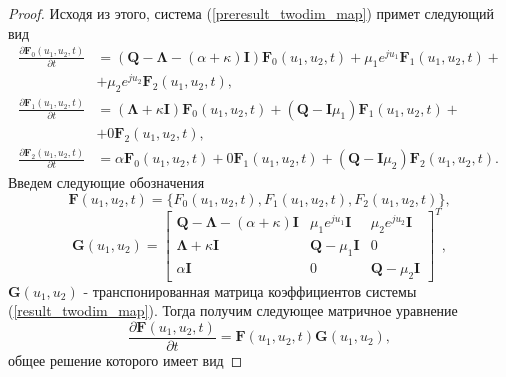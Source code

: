 \begin{proof}
	Исходя из этого, система (\ref{preresult_twodim_map}) примет следующий вид
	\begin{equation} \label{result_twodim_map}
		\begin{split}
			\frac{{\partial \boldsymbol{F}_{0}(u_{1},u_{2},t)}}{{\partial t}} &= (\boldsymbol{Q}-\boldsymbol{\Lambda}-(\alpha + \kappa)\boldsymbol{I})\boldsymbol{F}_{0}(u_{1},u_{2},t) + \mu_{1} e^{ju_{1}}\boldsymbol{F}_{1}(u_{1},u_{2},t)  + \\  &+ \mu_{2}e^{ju_{2}}\boldsymbol{F}_{2}(u_{1},u_{2},t),
			\\
			\frac{{\partial \boldsymbol{F}_{1}(u_{1},u_{2},t)}}{{\partial t}} &= (\boldsymbol{\Lambda} + \kappa\boldsymbol{I}) \boldsymbol{F}_{0}(u_{1},u_{2},t) +  (\boldsymbol{Q} - \boldsymbol{I}\mu_{1})\boldsymbol{F}_{1}(u_{1},u_{2},t) + \\&+ 0\boldsymbol{F}_{2}(u_{1},u_{2},t),
			\\
			\frac{{\partial \boldsymbol{F}_{2}(u_{1},u_{2},t)}}{{\partial t}} &= \alpha \boldsymbol{F}_{0}(u_{1},u_{2},t) + 0\boldsymbol{F}_{1}(u_{1},u_{2},t) +  (\boldsymbol{Q} - \boldsymbol{I}\mu_{2})\boldsymbol{F}_{2}(u_{1},u_{2},t).
		\end{split}
	\end{equation}  
	Введем следующие обозначения
	\begin{equation*}
		\boldsymbol{F}(u_{1},u_{2},t) = \{F_{0}(u_{1},u_{2},t),F_{1}(u_{1},u_{2},t),F_{2}(u_{1},u_{2},t)\},
	\end{equation*}  
	\begin{equation*}
		\boldsymbol{G}(u_{1},u_{2})=\begin{bmatrix}
			\boldsymbol{Q}-\boldsymbol{\Lambda}-(\alpha + \kappa)\boldsymbol{I} & \mu_{1}e^{ju_{1}}\boldsymbol{I} &  \mu_{2}e^{ju_{2}}\boldsymbol{I}\\
			\boldsymbol{\Lambda}+\kappa\boldsymbol{I} & \boldsymbol{Q}-\mu_{1}\boldsymbol{I} & 0\\
			\alpha\boldsymbol{I} & 	0 &	\boldsymbol{Q}-\mu_{2}\boldsymbol{I}
		\end{bmatrix}^{T},
	\end{equation*}
	$\boldsymbol{G}(u_{1},u_{2})$ - транспонированная матрица коэффициентов системы (\ref{result_twodim_map}).
	Тогда получим следующее матричное уравнение
	\begin{equation*}
		\frac{{\partial \boldsymbol{F}(u_{1},u_{2},t)}}{{\partial t}} =\boldsymbol{F}(u_{1},u_{2},t)\boldsymbol{G}(u_{1},u_{2}),
	\end{equation*}
	общее решение которого имеет вид

\end{proof}
